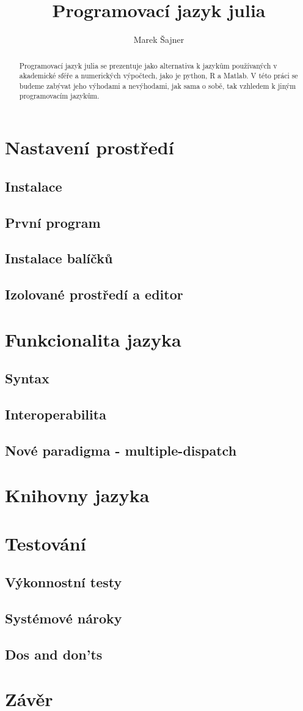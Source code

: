 \documentclass{article}
\title{Programovací jazyk julia}
\author{Marek Šajner}
\begin{document}
\maketitle
\tableofcontents
\begin{abstract}
    Programovací jazyk julia se prezentuje jako alternativa k jazykům používaných v akademické sféře a numerických výpočtech,
    jako je python, R a Matlab.
    V této práci se budeme zabývat jeho výhodami a nevýhodami, jak sama o sobě, tak vzhledem k jiným programovacím jazykům.
\end{abstract}
\newpage
\section{Nastavení prostředí}
\subsection{Instalace}
\subsection{První program}
\subsection{Instalace balíčků}
\subsection{Izolované prostředí a editor}
\section{Funkcionalita jazyka}
\subsection{Syntax}
\subsection{Interoperabilita}
\subsection{Nové paradigma - multiple-dispatch}
\section{Knihovny jazyka}
\section{Testování}
\subsection{Výkonnostní testy}
\subsection{Systémové nároky}
\subsection{Dos and don'ts}
\section{Závěr}
\end{document}
